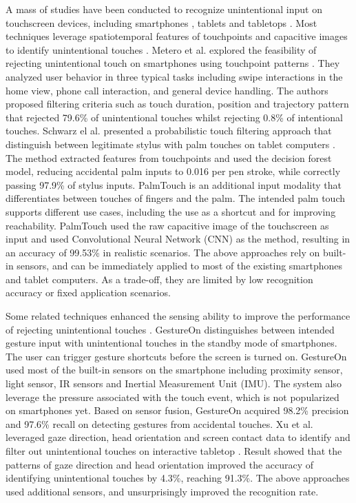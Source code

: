 A mass of studies have been conducted to recognize unintentional input on touchscreen devices, including smartphones \cite{2012-IdentifyUnint,2015-GestureOn,2018-PalmTouch,2019-BeyondUnint}, tablets \cite{2006-PadUnint,2014-PenUnint,2014-PalmRejection,2013-TapBoard,2016-TapBoard2} and tabletops \cite{2020-TabletopTouch}.
Most techniques leverage spatiotemporal features of touchpoints \cite{2012-IdentifyUnint,2006-PadUnint,2014-PalmRejection,2013-TapBoard,2016-TapBoard2} and capacitive images to identify unintentional touches \cite{2018-PalmTouch,2014-PenUnint}.
Metero et al. explored the feasibility of rejecting unintentional touch on smartphones using touchpoint patterns \cite{2012-IdentifyUnint}. They analyzed user behavior in three typical tasks including swipe interactions in the home view, phone call interaction, and general device handling. The authors proposed filtering criteria such as touch duration, position and trajectory pattern that rejected 79.6\% of unintentional touches whilst rejecting 0.8\% of intentional touches.
Schwarz el al. presented a probabilistic touch filtering approach that distinguish between legitimate stylus with palm touches on tablet computers \cite{2014-PalmRejection}. The method extracted features from touchpoints and used the decision forest model, reducing accidental palm inputs to 0.016 per pen stroke, while correctly passing 97.9\% of stylus inputs.
PalmTouch \cite{2018-PalmTouch} is an additional input modality that differentiates between touches of fingers and the palm. The intended palm touch supports different use cases, including the use as a shortcut and for improving reachability. PalmTouch used the raw capacitive image of the touchscreen as input and used Convolutional Neural Network (CNN) as the method, resulting in an accuracy of 99.53\% in realistic scenarios.
The above approaches rely on built-in sensors, and can be immediately applied to most of the existing smartphones and tablet computers. As a trade-off, they are limited by low recognition accuracy or fixed application scenarios.

Some related techniques enhanced the sensing ability to improve the performance of rejecting unintentional touches \cite{2015-GestureOn,2020-TabletopTouch,2001-PalmPressure,2019-BeyondUnint}.
GestureOn \cite{2015-GestureOn} distinguishes between intended gesture input with unintentional touches in the standby mode of smartphones. The user can trigger gesture shortcuts before the screen is turned on. GestureOn used most of the built-in sensors on the smartphone including proximity sensor, light sensor, IR sensors and Inertial Measurement Unit (IMU). The system also leverage the pressure associated with the touch event, which is not popularized on smartphones yet. Based on sensor fusion, GestureOn acquired 98.2\% precision and 97.6\% recall on detecting gestures from accidental touches.
Xu et al. leveraged gaze direction, head orientation and screen contact data to identify and filter out unintentional touches on interactive tabletop \cite{2020-TabletopTouch}. Result showed that the patterns of gaze direction and head orientation improved the accuracy of identifying unintentional touches by 4.3\%, reaching 91.3\%. The above approaches used additional sensors, and unsurprisingly improved the recognition rate.

